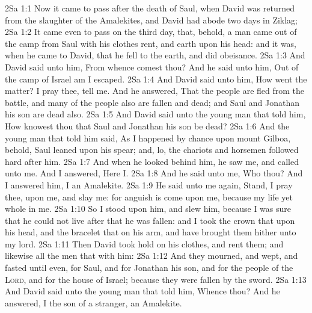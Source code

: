 \vs 2Sa 1:1 Now it came to pass after the death of Saul, when David was returned from the slaughter of the Amalekites, and David had abode two days in Ziklag;
\vs 2Sa 1:2 It came even to pass on the third day, that, behold, a man came out of the camp from Saul with his clothes rent, and earth upon his head: and  it was, when he came to David, that he fell to the earth, and did obeisance.
\vs 2Sa 1:3 And David said unto him, From whence comest thou? And he said unto him, Out of the camp of Israel am I escaped.
\vs 2Sa 1:4 And David said unto him, How went the matter? I pray thee, tell me. And he answered, That the people are fled from the battle, and many of the people also are fallen and dead; and Saul and Jonathan his son are dead also.
\vs 2Sa 1:5 And David said unto the young man that told him, How knowest thou that Saul and Jonathan his son be dead?
\vs 2Sa 1:6 And the young man that told him said, As I happened by chance upon mount Gilboa, behold, Saul leaned upon his spear; and, lo, the chariots and horsemen followed hard after him.
\vs 2Sa 1:7 And when he looked behind him, he saw me, and called unto me. And I answered, Here  I.
\vs 2Sa 1:8 And he said unto me, Who  thou? And I answered him, I  an Amalekite.
\vs 2Sa 1:9 He said unto me again, Stand, I pray thee, upon me, and slay me: for anguish is come upon me, because my life  yet whole in me.
\vs 2Sa 1:10 So I stood upon him, and slew him, because I was sure that he could not live after that he was fallen: and I took the crown that  upon his head, and the bracelet that  on his arm, and have brought them hither unto my lord.
\vs 2Sa 1:11 Then David took hold on his clothes, and rent them; and likewise all the men that  with him:
\vs 2Sa 1:12 And they mourned, and wept, and fasted until even, for Saul, and for Jonathan his son, and for the people of the \textsc{Lord}, and for the house of Israel; because they were fallen by the sword.
\vs 2Sa 1:13 And David said unto the young man that told him, Whence  thou? And he answered, I  the son of a stranger, an Amalekite.
